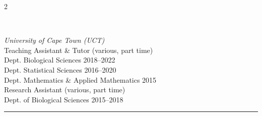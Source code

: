 \documentclass[10pt]{article}
\begin{document}
\begin{multicols}{2}
\columnbreak

\

\textit{University of Cape Town (UCT)} \\
\hspace{2em} Teaching Assistant \& Tutor (various, part time) \\
\hspace{3em} {\small Dept. Biological Sciences \hfill 2018--2022} \\
\hspace{3em} {\small Dept. Statistical Sciences \hfill 2016--2020} \\
\hspace{3em} {\small Dept. Mathematics \& Applied Mathematics \hfill 2015} \\
\hspace{2em} Research Assistant (various, part time) \\
\hspace{3em} {\small Dept. of Biological Sciences \hfill 2015--2018} \\

\columnbreak

\end{multicols} %

\hrule
\end{document}
